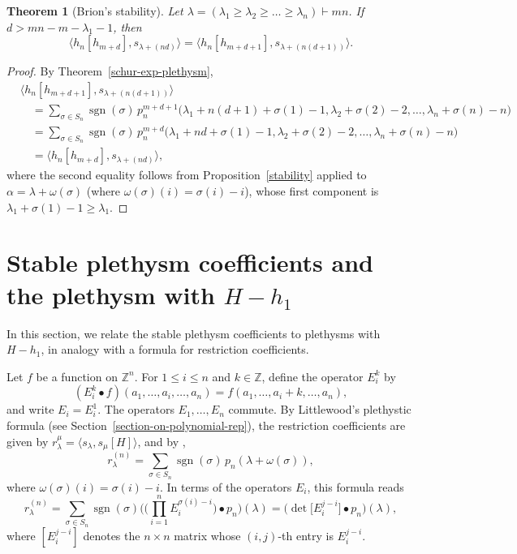 \documentclass[reqno]{amsart}
\theoremstyle{plain}
\newtheorem{theorem}{Theorem}[section]
\theoremstyle{definition}
\theoremstyle{remark}
\theoremstyle{plain}
\newcommand{\Z}{\mathbb{Z}}
\DeclareMathOperator{\sgn}{sgn}
\begin{document}
\begin{theorem}[Brion's stability]\label{proof2}
Let $\lambda=(\lambda_1\ge\lambda_2\ge\dots\ge\lambda_n)\vdash mn$. If
$d>mn-m-\lambda_1-1$, then
$$\langle h_n[h_{m+d}],s_{\lambda+(nd)}\rangle=\langle h_n[h_{m+d+1}],s_{\lambda+(n(d+1))}\rangle.$$
\end{theorem}
\begin{proof}
By Theorem~\ref{schur-exp-plethysm},
\begin{align*}
&\langle h_n[h_{m+d+1}],s_{\lambda+(n(d+1))}\rangle\\
&\quad=\sum_{\sigma\in S_n}\sgn(\sigma)\, p_{n}^{m+d+1}\big(\lambda_1+n(d+1)+\sigma(1)-1,\lambda_2+\sigma(2)-2,\dots,\lambda_n+\sigma(n)-n\big)\\
&\quad=\sum_{\sigma\in S_n}\sgn(\sigma)\, p_{n}^{m+d}\big(\lambda_1+nd+\sigma(1)-1,\lambda_2+\sigma(2)-2,\dots,\lambda_n+\sigma(n)-n\big)\\
&\quad=\langle h_n[h_{m+d}],s_{\lambda+(nd)}\rangle,
\end{align*}
where the second equality follows from Proposition~\ref{stability} applied to
$\alpha=\lambda+\omega(\sigma)$ (where $\omega(\sigma)(i)=\sigma(i)-i$), whose first component is
$\lambda_1+\sigma(1)-1\ge\lambda_1$.
\end{proof}

\section{Stable plethysm coefficients and the plethysm with \texorpdfstring{$H-h_1$}{H-h1}}\label{stable-plethysm}
In this section, we relate the stable plethysm coefficients to plethysms with
$H-h_1$, in analogy with a formula for restriction coefficients.

Let $f$ be a function on $\Z^n$. For $1\le i\le n$ and $k\in\Z$, define the
operator $E_i^k$ by
\begin{equation}\label{def-of-E-i-k}
(E_i^k\bullet f)(a_1,\dots,a_i,\dots,a_n)=f(a_1,\dots,a_i+k,\dots,a_n),
\end{equation}
and write $E_i=E_i^1$. The operators $E_1,\dots,E_n$ commute. By Littlewood's
plethystic formula (see Section~\ref{section-on-polynomial-rep}), the
restriction coefficients are given by
$r_\lambda^\mu=\langle s_\lambda,s_\mu[H]\rangle$, and by
\cite[Corollary~4.2]{narayanan},
\begin{equation*}
    r_\lambda^{(n)}=\sum_{\sigma\in S_n}\sgn(\sigma)\,p_n(\lambda+\omega(\sigma)),
\end{equation*}
where $\omega(\sigma)(i)=\sigma(i)-i$. In terms of the operators $E_i$, this
formula reads
\begin{equation*}
    r_\lambda^{(n)}=\sum_{\sigma\in S_n}\sgn(\sigma)\bigg(\Big(\prod_{i=1}^nE_i^{\sigma(i)-i}\Big)\bullet p_n\bigg)(\lambda)=\Big(\det\big[E_i^{j-i}\big]\bullet p_n\Big)(\lambda),
\end{equation*}
where $[E_i^{j-i}]$ denotes the $n\times n$ matrix whose $(i,j)$-th entry is $E_i^{j-i}$.
\end{document}

